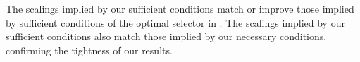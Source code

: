 \documentclass[bj,authoryear]{imsart}
\theoremstyle{plain}
\begin{document}
The scalings implied by our sufficient conditions match or improve those implied by sufficient conditions of the optimal selector in \cite{infotheowainwright}. The scalings implied by our sufficient conditions also match those implied by our necessary conditions, confirming the tightness of our results. 
\end{document}
